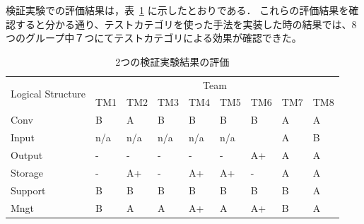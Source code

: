 \documentclass[a4paper,12pt]{jreport}
\begin{document}
検証実験での評価結果は，表~\ref{tbl:D-3-tbl5}
に示したとおりである．
これらの評価結果を確認すると分かる通り、テストカテゴリを使った手法を実装した時の結果では、8つのグループ中７つにてテストカテゴリによる効果が確認できた。

\begin{table}[htbp]
\footnotesize
  \centering
  \caption{2つの検証実験結果の評価}
    \begin{tabular}{|l|l|l|l|l|l|l|l|l|}
    \hline
    \multicolumn{1}{|c|}{\multirow{2}[4]{*}{Logical
Structure}} & \multicolumn{8}{c|}{Team} \bigstrut\\
\cline{2-9}          & TM1   & TM2   & TM3   & TM4   & TM5   & TM6 & TM7 & TM8 \bigstrut\\
    \hline
    Conv  & B     & A     & B     & B     & B     & B & A     & A\bigstrut\\
    \hline
    Input &  n/a     &   n/a    &   n/a    &   n/a    &   n/a    &  & A     & B   \bigstrut\\
    \hline
    Output & -     & -     & -     & -     & -     & A+ & A     & A \bigstrut\\
    \hline
    Storage & -     & A+    & -     & A+    & A+    & -& A     & A  \bigstrut\\
    \hline
    Support & B     & B     & B     & B     & B     & B& B     & A \bigstrut[t]\\
    Mngt  & B     & A     & A     & A+    & A     & A+& B     & A \bigstrut[b]\\
    \hline
    \end{tabular}%
  \label{tbl:D-3-tbl5}%
\end{table}%

\end{document}
